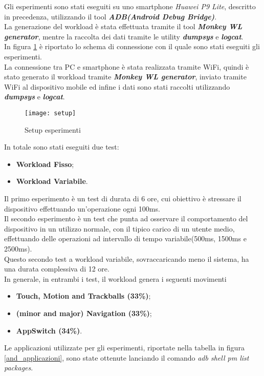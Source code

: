 Gli esperimenti sono stati eseguiti su uno smartphone \textit{Huawei P9 Lite}, descritto
in precedenza, utilizzando il tool \textit{\textbf{ADB(Android Debug Bridge)}}.\\
La generazione del workload è stata effettuata tramite il tool
\textit{\textbf{Monkey WL generator}}, mentre la raccolta dei dati tramite le
utility \textit{\textbf{dumpsys}} e \textit{\textbf{logcat}}.\\
In figura \ref{and_setup} è riportato lo schema di connessione con il quale sono stati
eseguiti gli esperimenti.\\
La connessione tra PC e smartphone è stata realizzata tramite WiFi, quindi è
stato generato il workload tramite \textit{\textbf{Monkey WL generator}}, inviato
tramite WiFi al dispositivo mobile ed infine i dati sono stati raccolti
utilizzando \textit{\textbf{dumpsys}} e \textit{\textbf{logcat}}.\\

\begin{figure}[!htbp]
  \centering
  \texttt{[image: setup]}
  \caption{Setup esperimenti}
  \label{and_setup}
\end{figure}

In totale sono stati eseguiti due test:
\begin{itemize}
  \item \textbf{Workload Fisso};
  \item \textbf{Workload Variabile}.
\end{itemize}

Il primo esperimento è un test di durata di 6 ore, cui obiettivo è stressare il
dispositivo effettuando un'operazione ogni 100ms.\\
Il secondo esperimento è un test che punta ad osservare il comportamento del dispositivo
in un utilizzo normale, con il tipico carico di un utente medio, effettuando
delle operazioni ad intervallo di tempo variabile(500ms, 1500ms e 2500ms).\\
Questo secondo test a workload variabile, sovraccaricando meno il sistema, ha una
durata complessiva di 12 ore.\\
In generale, in entrambi i test, il workload genera i seguenti movimenti
\begin{itemize}
  \item \textbf{Touch, Motion and Trackballs (33\%)};
  \item \textbf{(minor and major) Navigation (33\%)};
  \item \textbf{AppSwitch (34\%)}.
\end{itemize}
Le applicazioni utilizzate per gli esperimenti, riportate nella tabella in figura
\ref{and_applicazioni}, sono state ottenute lanciando il comando
\textit{adb shell pm list packages}.\\

